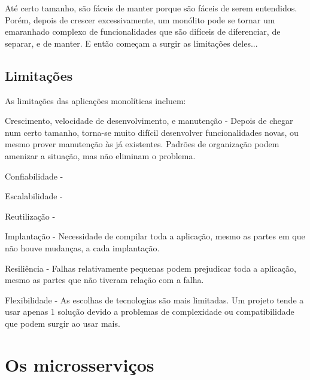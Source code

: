 Até certo tamanho, são fáceis de manter porque são fáceis de serem entendidos. Porém, depois de crescer excessivamente, um monólito pode se tornar um emaranhado complexo de funcionalidades que são difíceis de diferenciar, de separar, e de manter. E então começam a surgir as limitações deles...

\subsection{Limitações}\label{subsection-monolitos-limitacoes}

As limitações das aplicações monolíticas incluem:

Crescimento, velocidade de desenvolvimento, e manutenção - Depois de chegar num certo tamanho, torna-se muito difícil desenvolver funcionalidades novas, ou mesmo prover manutenção às já existentes. Padrões de organização podem amenizar a situação, mas não eliminam o problema.

Confiabilidade - 

Escalabilidade -

Reutilização - 

Implantação - Necessidade de compilar toda a aplicação, mesmo as partes em que não houve mudanças, a cada implantação.

Resiliência - Falhas relativamente pequenas podem prejudicar toda a aplicação, mesmo as partes que não tiveram relação com a falha.

Flexibilidade - As escolhas de tecnologias são mais limitadas. Um projeto tende a usar apenas 1 solução devido a problemas de complexidade ou compatibilidade que podem surgir ao usar mais.

\section{Os microsserviços}

